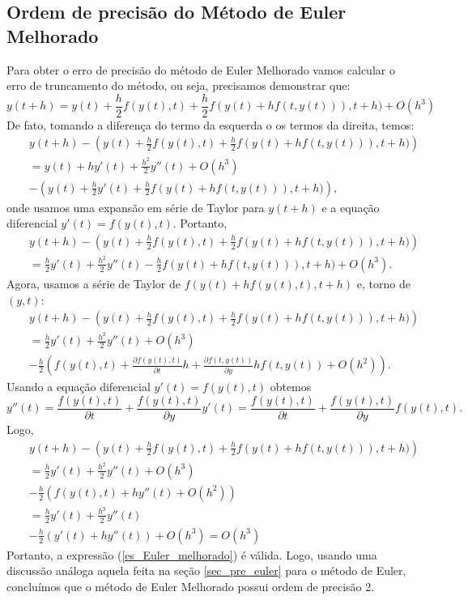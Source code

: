 \subsection{Ordem de precisão do Método de Euler Melhorado}
Para obter o erro de precisão do método de Euler Melhorado vamos calcular o erro de truncamento do método, ou seja, precisamos demonstrar que:
\begin{equation}\label{es_Euler_melhorado}
y(t+h)=y(t)+\frac{h}{2} f(y(t),t)+\frac{h}{2} f(y(t)+hf(t,y(t))),t+h)+O(h^3)
\end{equation}
De fato, tomando a diferença do termo da esquerda o os termos da direita, temos:
\begin{eqnarray*}
&&y(t+h)-\left(y(t)+\frac{h}{2} f(y(t),t)+\frac{h}{2} f(y(t)+hf(t,y(t))),t+h)\right)\\
&&=y(t)+hy'(t)+\frac{h^2}{2}y''(t)+O(h^3)\\
&&-\left(y(t)+\frac{h}{2} y'(t)+\frac{h}{2} f(y(t)+hf(t,y(t))),t+h)\right),
\end{eqnarray*}
onde usamos uma expansão em série de Taylor para $y(t+h)$ e a equação diferencial $y'(t)=f(y(t),t)$. Portanto,
\begin{eqnarray*}
&&y(t+h)-\left(y(t)+\frac{h}{2} f(y(t),t)+\frac{h}{2} f(y(t)+hf(t,y(t))),t+h)\right)\\
&&=\frac{h}{2}y'(t)+\frac{h^2}{2}y''(t)-\frac{h}{2} f(y(t)+hf(t,y(t))),t+h)+O(h^3).
\end{eqnarray*}
Agora, usamos a série de Taylor de $f(y(t)+hf(y(t),t),t+h)$ e, torno de $(y,t)$:
\begin{eqnarray*}
&&y(t+h)-\left(y(t)+\frac{h}{2} f(y(t),t)+\frac{h}{2} f(y(t)+hf(t,y(t))),t+h)\right)\\
&&=\frac{h}{2}y'(t)+\frac{h^2}{2}y''(t)+O(h^3)\\
&&-\frac{h}{2}\left(f(y(t),t)+\frac{\partial f(y(t),t) }{\partial t}h +\frac{\partial f(t,y(t))}{\partial y} hf(t,y(t))+O(h^2)\right).
\end{eqnarray*}
Usando a equação diferencial $y'(t)=f(y(t),t)$ obtemos 
$$
y''(t)=\frac{f(y(t),t)}{\partial t}+\frac{f(y(t),t)}{\partial y}y'(t)=\frac{f(y(t),t)}{\partial t}+\frac{f(y(t),t)}{\partial y}f(y(t),t).
$$
Logo,
\begin{eqnarray*}
&&y(t+h)-\left(y(t)+\frac{h}{2} f(y(t),t)+\frac{h}{2} f(y(t)+hf(t,y(t))),t+h)\right)\\
&&=\frac{h}{2}y'(t)+\frac{h^2}{2}y''(t)+O(h^3)\\
&&-\frac{h}{2}\left(f(y(t),t)+hy''(t)+O(h^2)\right)\\
&&=\frac{h}{2}y'(t)+\frac{h^2}{2}y''(t)\\
&&-\frac{h}{2}\left(y'(t)+hy''(t)\right)+O(h^3)=O(h^3)
\end{eqnarray*}
Portanto, a expressão (\ref{es_Euler_melhorado}) é válida. Logo, usando uma discussão análoga aquela feita na seção \ref{sec_pre_euler} para o método de Euler, concluímos que o método de Euler Melhorado possui ordem de precisão 2.


